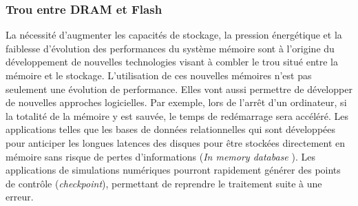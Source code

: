     \subsubsection{Trou entre DRAM et Flash}

        La nécessité d'augmenter les capacités de stockage, la pression énergétique et la faiblesse d'évolution des performances du système mémoire sont à l'origine du développement de nouvelles technologies visant à combler le trou situé entre la mémoire et le stockage. L'utilisation de ces nouvelles mémoires n'est pas seulement une évolution de performance. Elles vont aussi permettre de développer de nouvelles approches logicielles. Par exemple, lors de l'arrêt d'un ordinateur, si la totalité de la mémoire y est sauvée, le temps de redémarrage sera accéléré. Les applications telles que les bases de données relationnelles qui sont développées pour anticiper les longues latences des disques pour être stockées directement en mémoire sans risque de pertes d'informations (\textit{In memory database} \cite{Oukid2015}). Les applications de simulations numériques pourront rapidement générer des points de contrôle (\textit{checkpoint}), permettant de reprendre le traitement suite à une erreur. 
        
        
        
